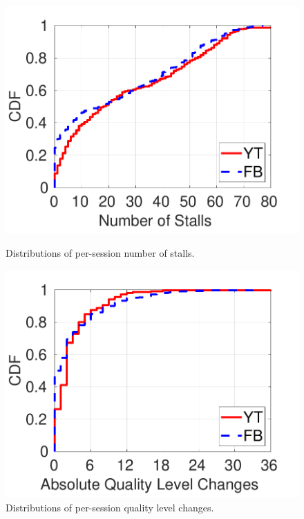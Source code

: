 \begin{figure}[t]
	\centering
	\begin{minipage}{.4\textwidth}
		\centering
		\includegraphics[width=\linewidth]{figs/lime/num_of_stalls.pdf} \vspace{-.25in}
		\caption{\small Distributions of per-session number of stalls.}
		\label{fig:stall_num}
	\end{minipage}
	\begin{minipage}{.4\textwidth}
		\centering
		\includegraphics[width=\linewidth]{figs/lime/quality_change.pdf} \vspace{-.25in}
		\caption{\small Distributions of per-session quality level changes.}
		\label{fig:quality_change}
	\end{minipage}
\end{figure}


